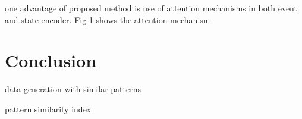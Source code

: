 \documentclass[journal,twoside,web]{ieeecolor}
\begin{document}
one advantage of proposed method is use of attention mechanisms in both event and state encoder.
Fig 1 shows the attention mechanism





\section{Conclusion}
\label{sec:Conclusion}

data generation with similar patterns

pattern similarity index















\end{document}
